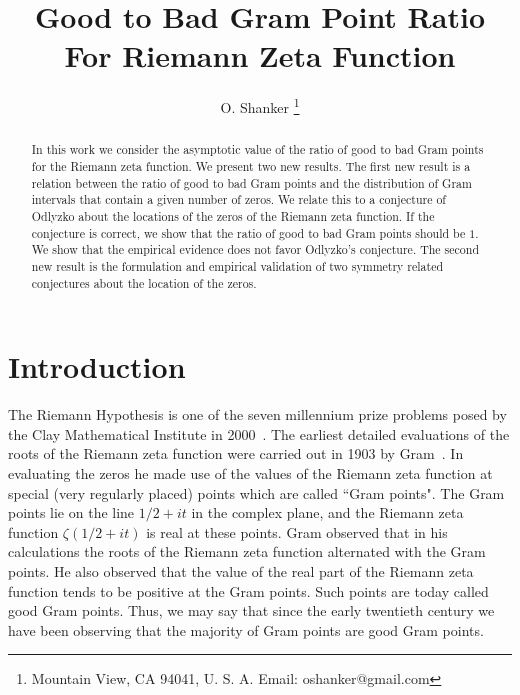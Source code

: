 \documentclass[twoside]{article}
\begin{document}
\date{}
\lhead[]{}
\chead[]{}
\rhead[]{}

\title{\bf{Good to Bad Gram Point Ratio For Riemann Zeta Function}}
%

\author{O. Shanker 
 \thanks{Mountain View, CA 94041, U. S. A. Email: oshanker@gmail.com
 }
}

\maketitle
\thispagestyle{fancy}

\begin{abstract}
In this work we consider the asymptotic value of the ratio of good to bad Gram points for the Riemann zeta function.
We present two new results. The first new result is a relation between the ratio of good to bad Gram points and the distribution of Gram intervals that contain a given number of zeros.
We relate this to a conjecture of Odlyzko about the locations of the zeros of the Riemann zeta function.
If the conjecture is correct, we show that the ratio of good to bad Gram points should be $1$. 
We show that the empirical evidence does not favor Odlyzko's conjecture. The  second new result is the formulation and empirical validation of two 
symmetry related conjectures about the location of the zeros.
\end{abstract}



{}


\section{Introduction}
The Riemann Hypothesis is one of the seven millennium prize problems posed by the Clay Mathematical Institute in 2000~\cite{Sarnak 2005}. 
The earliest detailed evaluations of the roots of the Riemann zeta function were carried out in 1903 by Gram~\cite{Gram 1903}.
In evaluating the zeros he made use of the values of the Riemann zeta function at special (very regularly placed) points which are called ``Gram points".
The Gram points lie on the line $1/2+it$ in the complex plane, and the Riemann zeta function $\zeta(1/2+it)$ is real at these points. 
Gram observed that in his calculations the roots of the Riemann zeta function alternated with the Gram points. He also observed that the
value of the real part of the Riemann zeta function tends to be positive at the Gram points. Such points are today called good Gram points. Thus, we may say that since the early 
twentieth century we have been observing that the majority of Gram points are good Gram points. 
\end{document}

